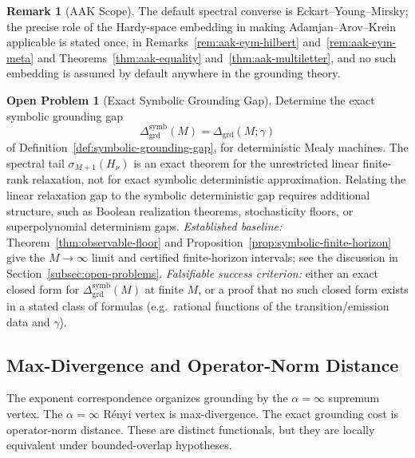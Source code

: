 \documentclass[12pt]{article}
\theoremstyle{definition}
\newtheorem{remark}[theorem]{Remark}
\newtheorem{openproblem}[theorem]{Open Problem}
\begin{document}
\begin{remark}[AAK Scope]
\label{rem:grounding-aak}
The default spectral converse is Eckart--Young--Mirsky; the precise role of
the Hardy-space embedding in making Adamjan--Arov--Krein applicable is stated
once, in Remarks~\ref{rem:aak-eym-hilbert} and~\ref{rem:aak-eym-meta} and
Theorems~\ref{thm:aak-equality} and~\ref{thm:aak-multiletter}, and no such
embedding is assumed by default anywhere in the grounding theory.
\end{remark}

\begin{openproblem}[Exact Symbolic Grounding Gap]
\label{open:symbolic-grounding}
Determine the exact symbolic grounding gap
\[
\Delta_{\mathrm{grd}}^{\mathrm{symb}}(M)
=
\Delta_{\mathrm{grd}}(M;\gamma)
\]
of Definition~\ref{def:symbolic-grounding-gap}, for deterministic Mealy
machines.  The spectral tail
$\sigma_{M+1}(H_\nu)$ is an exact theorem for the unrestricted linear
finite-rank relaxation, not for exact symbolic deterministic approximation.
Relating the linear relaxation gap to the symbolic deterministic gap requires
additional structure, such as Boolean realization theorems, stochasticity
floors, or superpolynomial determinism gaps.  \emph{Established baseline:}
Theorem~\ref{thm:observable-floor} and
Proposition~\ref{prop:symbolic-finite-horizon} give the $M\to\infty$ limit and
certified finite-horizon intervals; see the discussion in
Section~\ref{subsec:open-problems}.  \emph{Falsifiable success criterion:}
either an exact closed form for $\Delta_{\mathrm{grd}}^{\mathrm{symb}}(M)$ at
finite $M$, or a proof that no such closed form exists in a stated class of
formulas (e.g.\ rational functions of the transition/emission data and
$\gamma$).
\end{openproblem}

\subsection{Max-Divergence and Operator-Norm Distance}
\label{subsec:grounding-maxdiv}

The exponent correspondence organizes grounding by the $\alpha=\infty$
supremum vertex.  The $\alpha=\infty$ R\'enyi vertex is max-divergence.  The
exact grounding cost is operator-norm distance.  These are distinct
functionals, but they are locally equivalent under bounded-overlap hypotheses.
\end{document}
